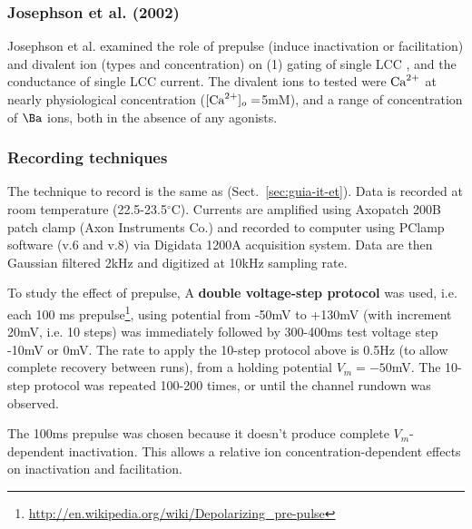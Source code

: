 \subsubsection{Josephson et al. (2002)}
\label{sec:josephson-et-al}

Josephson et al. examined the role of prepulse (induce inactivation or
facilitation) and divalent ion (types and concentration) on (1) gating
of single LCC \citep{josephson2002mgu}, and the
conductance \citep{josephson2002mcu} of single LCC current. The
divalent ions to tested were ${\text{Ca}^{2+}}$ at nearly physiological
concentration ($[{\text{Ca}^{2+}}]_o=$5mM), and a range of concentration of $\Ba$
ions, both in the absence of any agonists.

\subsubsection{Recording techniques}
\label{sec:recording-techniques}

The technique to record is the same as \citep{guia2001}
(Sect.~\ref{sec:guia-it-et}). Data is recorded at room temperature
(22.5-23.5$^\circ$C). Currents are amplified using Axopatch 200B patch
clamp (Axon Instruments Co.) and recorded to computer using PClamp
software (v.6 and v.8) via Digidata 1200A acquisition system. Data are
then Gaussian filtered 2kHz \citep{sakmann1983} and digitized at 10kHz
sampling rate.

To study the effect of prepulse, A {\bf double voltage-step protocol}
was used, i.e. each 100 ms
prepulse\footnote{\url{http://en.wikipedia.org/wiki/Depolarizing_pre-pulse}},
using potential from -50mV to +130mV (with increment 20mV, i.e. 10
steps) was immediately followed by 300-400ms test voltage step -10mV
or 0mV.  The rate to apply the 10-step protocol above is 0.5Hz (to
allow complete recovery between runs), from a holding potential
$V_m=-50$mV.  The 10-step protocol was repeated 100-200 times, or
until the channel rundown was observed.

\begin{framed}
  The 100ms prepulse was chosen because it doesn't produce complete
  $V_m$-dependent inactivation. This allows a relative ion
  concentration-dependent effects on inactivation and facilitation. 
\end{framed}

